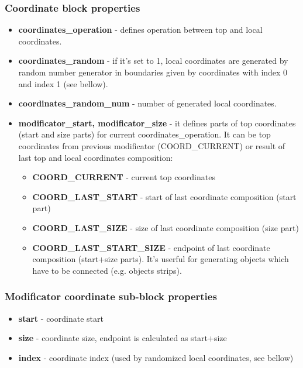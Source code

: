 \documentclass[9pt]{article}
\begin{document}
\subsubsection*{Coordinate block properties}
\begin{itemize}
\item{\bf coordinates\_operation} - defines operation between top and local coordinates.
\item{\bf coordinates\_random} - if it's set to 1, local coordinates are generated by random number
generator in boundaries given by coordinates with index 0 and index 1 (see bellow).
\item{\bf coordinates\_random\_num} - number of generated local coordinates.    
\item{\bf modificator\_start, modificator\_size} - it defines parts of top 
coordinates (start and size parts) for current coordinates\_operation. 
It can be top coordinates from previous modificator (COORD\_CURRENT) or 
result of last top and local coordinates composition:
\begin{itemize}
\item{\bf COORD\_CURRENT} - current top coordinates
\item{\bf COORD\_LAST\_START} - start of last coordinate composition (start part)
\item{\bf COORD\_LAST\_SIZE} - size of last coordinate composition (size part)
\item{\bf COORD\_LAST\_START\_SIZE} - endpoint of last coordinate composition (start+size parts).
It's userful for generating objects which have to be connected (e.g. objects strips).
\end{itemize}
\end{itemize}
\subsubsection*{Modificator coordinate sub-block properties}
\begin{itemize}
\item{\bf start} - coordinate start
\item{\bf size} - coordinate size, endpoint is calculated as start+size
\item{\bf index} - coordinate index (used by randomized local coordinates, see bellow)
\end{itemize}
\end{document}
